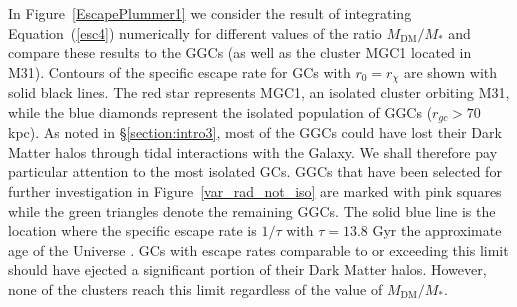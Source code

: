 \documentclass[aps,floatfix,prd,showpacs]{revtex4}
\newcommand{\rx}{r_\chi}
\newcommand{\MDM}{M_{\mathrm{DM}}}
\begin{document}
In Figure~\ref{EscapePlummer1} we consider the result of integrating Equation~(\ref{esc4}) numerically for different values of the ratio $\MDM/M_*$ and compare these results to the GGCs (as well as the cluster MGC1 located in M31). Contours of the specific escape rate for GCs with $r_0 = \rx$ are shown with solid black lines. The red star represents MGC1, an isolated cluster orbiting M31, while the blue diamonds represent the isolated population of GGCs ($r_{gc} > 70$ kpc). As noted in \S\ref{section:intro3}, most of the GGCs could have lost their Dark Matter halos through tidal interactions with the Galaxy. We shall therefore pay particular attention to the most isolated GCs. GGCs that have been selected for further investigation in Figure~\ref{var_rad_not_iso} are marked with pink squares while the green triangles denote the remaining GGCs. The solid blue line is the location where the specific escape rate is $1/\tau$ with $\tau = 13.8$ Gyr the approximate age of the Universe \cite{Planck15}. GCs with escape rates comparable to or exceeding this limit should have ejected a significant portion of their Dark Matter halos. However, none of the clusters reach this limit regardless of the value of $\MDM/M_*$.
%
\end{document}
